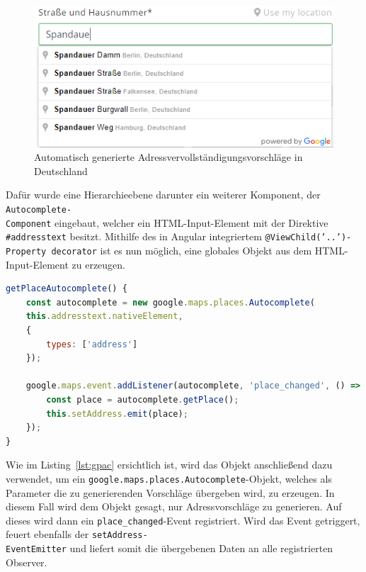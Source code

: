 \begin{figure}[H]
	\centerline{
		\includegraphics[width=1\textwidth, frame]{./grafiken/open_adress_completion_de.PNG}
	}
	\vskip0pt
	\caption{Automatisch generierte Adressvervollständigungsvorschläge in Deutschland}
\end{figure}

Dafür wurde eine Hierarchieebene darunter ein weiterer Komponent, der \texttt{Autocomplete-\\Component} eingebaut, welcher ein HTML-Input-Element mit der Direktive \texttt{\#addresstext} besitzt. Mithilfe des in Angular integriertem \texttt{@ViewChild('..')-Property decorator} ist es nun möglich, eine globales Objekt aus dem HTML-Input-Element zu erzeugen. 

\begin{lstlisting}[caption={Die \texttt{getPlaceAutocomplete()}-Methode der \texttt{AutocompleteComponent}-Klasse}, language=JavaScript,label={lst:gpac}]
getPlaceAutocomplete() {
	const autocomplete = new google.maps.places.Autocomplete(
	this.addresstext.nativeElement,
	{
		types: ['address']
	});
	
	google.maps.event.addListener(autocomplete, 'place_changed', () => {
		const place = autocomplete.getPlace();
		this.setAddress.emit(place);
	});
}
\end{lstlisting}

Wie im Listing~\ref{lst:gpac} ersichtlich ist, wird das Objekt anschließend dazu verwendet, um ein \texttt{google.maps.places.Autocomplete}-Objekt, welches als Parameter die zu generierenden Vorschläge übergeben wird, zu erzeugen. In diesem Fall wird dem Objekt gesagt, nur Adressvorschläge zu generieren. Auf dieses wird dann ein \texttt{place\_changed}-Event registriert. Wird das Event getriggert, feuert ebenfalls der \texttt{setAddress-\\EventEmitter} und liefert somit die übergebenen Daten an alle registrierten Observer.

